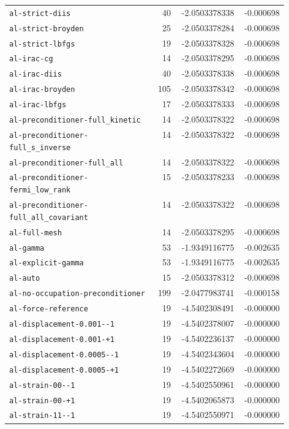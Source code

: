 \begin{longtable}{p{0.53\linewidth}rrr}
\nolinkurl{al-strict-diis} & 40 & -2.0503378338 & -0.000698\\
\nolinkurl{al-strict-broyden} & 25 & -2.0503378284 & -0.000698\\
\nolinkurl{al-strict-lbfgs} & 19 & -2.0503378328 & -0.000698\\
\nolinkurl{al-irac-cg} & 14 & -2.0503378295 & -0.000698\\
\nolinkurl{al-irac-diis} & 40 & -2.0503378338 & -0.000698\\
\nolinkurl{al-irac-broyden} & 105 & -2.0503378342 & -0.000698\\
\nolinkurl{al-irac-lbfgs} & 17 & -2.0503378333 & -0.000698\\
\nolinkurl{al-preconditioner-full_kinetic} & 14 & -2.0503378322 & -0.000698\\
\nolinkurl{al-preconditioner-full_s_inverse} & 14 & -2.0503378322 & -0.000698\\
\nolinkurl{al-preconditioner-full_all} & 14 & -2.0503378322 & -0.000698\\
\nolinkurl{al-preconditioner-fermi_low_rank} & 15 & -2.0503378233 & -0.000698\\
\nolinkurl{al-preconditioner-full_all_covariant} & 14 & -2.0503378322 & -0.000698\\
\nolinkurl{al-full-mesh} & 14 & -2.0503378295 & -0.000698\\
\nolinkurl{al-gamma} & 53 & -1.9349116775 & -0.002635\\
\nolinkurl{al-explicit-gamma} & 53 & -1.9349116775 & -0.002635\\
\nolinkurl{al-auto} & 15 & -2.0503378312 & -0.000698\\
\nolinkurl{al-no-occupation-preconditioner} & 199 & -2.0477983741 & -0.000158\\
\nolinkurl{al-force-reference} & 19 & -4.5402308491 & -0.000000\\
\nolinkurl{al-displacement-0.001--1} & 19 & -4.5402378007 & -0.000000\\
\nolinkurl{al-displacement-0.001-+1} & 19 & -4.5402236137 & -0.000000\\
\nolinkurl{al-displacement-0.0005--1} & 19 & -4.5402343604 & -0.000000\\
\nolinkurl{al-displacement-0.0005-+1} & 19 & -4.5402272669 & -0.000000\\
\nolinkurl{al-strain-00--1} & 19 & -4.5402550961 & -0.000000\\
\nolinkurl{al-strain-00-+1} & 19 & -4.5402065873 & -0.000000\\
\nolinkurl{al-strain-11--1} & 19 & -4.5402550971 & -0.000000\\

\end{longtable}
